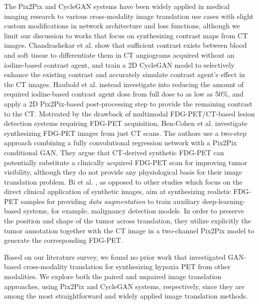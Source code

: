 The Pix2Pix and CycleGAN systems have been widely applied in medical imaging research to various cross-modality image translation use cases \cite{yi2019generative} with slight custom modifications in network architecture and loss functions, although we limit our discussion to works that focus on synthesizing contrast maps from CT images. Chandrashekar et al. \cite{chandrashekar2020deep} show that sufficient contrast exists between blood and soft tissue to differentiate them in CT angiograms acquired without an iodine-based contrast agent, and train a 2D CycleGAN model to selectively enhance the existing contrast and accurately simulate contrast agent's effect in the CT images. Haubold et al. \cite{haubold2021contrast} instead investigate into reducing the amount of required iodine-based contrast agent dose from full dose to as low as 50\%, and apply a 2D Pix2Pix-based post-processing step to provide the remaining contrast to the CT. Motivated by the drawback of multimodal FDG-PET/CT-based lesion detection systems requiring FDG-PET acquisition, Ben-Cohen et al. \cite{bencohen2018crossmodality} investigate synthesizing FDG-PET images from just CT scans. The authors use a two-step approach combining a fully convolutional regression network with a Pix2Pix conditional GAN. They argue that CT-derived synthetic FDG-PET can potentially substitute a clinically acquired FDG-PET scan for improving tumor visibility, although they do not provide any physiological basis for their image translation problem. Bi et al. \cite{bi2017synthesis}, as opposed to other studies which focus on the direct clinical application of synthetic images, aim at synthesizing realistic FDG-PET samples for providing \textit{data augmentation} to train auxiliary deep-learning-based systems, for example, malignancy detection models. In order to preserve the position and shape of the tumor across translation, they utilize explicitly the tumor annotation together with the CT image in a two-channel Pix2Pix model to generate the corresponding FDG-PET. 

Based on our literature survey, we found no prior work that investigated GAN-based cross-modality translation for synthesizing hypoxia PET from other modalities. We explore both the paired and unpaired image translation approaches, using Pix2Pix and CycleGAN systems, respectively, since they are among the most straightforward and widely applied image translation methods.



